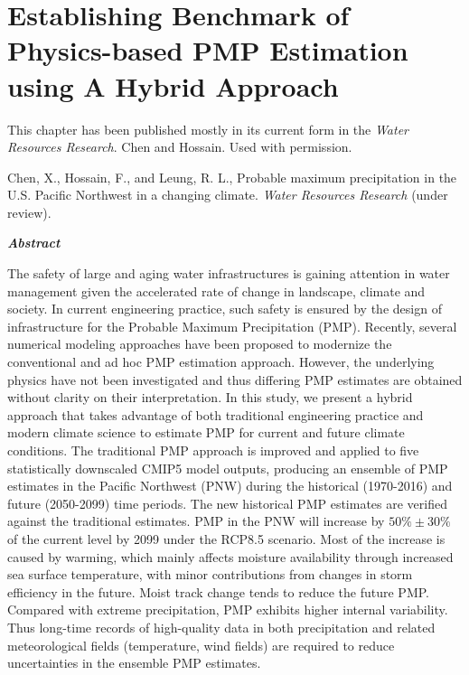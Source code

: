\chapter {Establishing Benchmark of Physics-based PMP Estimation using A Hybrid Approach}
\label{ch:WRR}



This chapter has been published mostly in its current form in the \textit{Water Resources Research}. \textcopyright Chen and Hossain. Used with permission.\\

\bigbreak

\noindent
{}
\setlength{\hangindent}{2em}
Chen, X., Hossain, F., and Leung, R. L., Probable maximum precipitation in the U.S. Pacific Northwest in a changing climate. \textit{Water Resources Research} (under review).

\vspace{10mm}

\noindent
\textit{\textbf{Abstract}}
 
The safety of large and aging water infrastructures is gaining attention in water management given the accelerated rate of change in landscape, climate and society. In current engineering practice, such safety is ensured by the design of infrastructure for the Probable Maximum Precipitation (PMP). Recently, several numerical modeling approaches have been proposed to modernize the conventional and ad hoc PMP estimation approach. However, the underlying physics have not been investigated and thus differing PMP estimates are obtained without clarity on their interpretation. In this study, we present a hybrid approach that takes advantage of both traditional engineering practice and modern climate science to estimate PMP for current and future climate conditions. The traditional PMP approach is improved and applied to five statistically downscaled CMIP5 model outputs, producing an ensemble of PMP estimates in the Pacific Northwest (PNW) during the historical (1970-2016) and future (2050-2099) time periods. The new historical PMP estimates are verified against the traditional estimates. PMP in the PNW will increase by $50\%\pm30\%$ of the current level by 2099 under the RCP8.5 scenario. Most of the increase is caused by warming, which mainly affects moisture availability through increased sea surface temperature, with minor contributions from changes in storm efficiency in the future. Moist track change tends to reduce the future PMP. Compared with extreme precipitation, PMP exhibits higher internal variability. Thus long-time records of high-quality data in both precipitation and related meteorological fields (temperature, wind fields) are required to reduce uncertainties in the ensemble PMP estimates.

